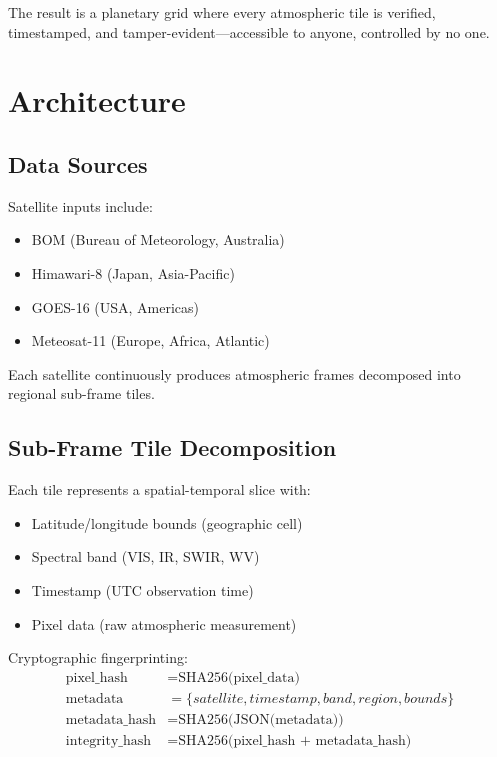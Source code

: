 \documentclass[11pt]{article}
\begin{document}
The result is a planetary grid where every atmospheric tile is verified, timestamped, and tamper-evident---accessible to anyone, controlled by no one.

\section{Architecture}

\subsection{Data Sources}

Satellite inputs include:
\begin{itemize}
    \item BOM (Bureau of Meteorology, Australia)
    \item Himawari-8 (Japan, Asia-Pacific)
    \item GOES-16 (USA, Americas)
    \item Meteosat-11 (Europe, Africa, Atlantic)
\end{itemize}

Each satellite continuously produces atmospheric frames decomposed into regional sub-frame tiles.

\subsection{Sub-Frame Tile Decomposition}

Each tile represents a spatial-temporal slice with:
\begin{itemize}
    \item Latitude/longitude bounds (geographic cell)
    \item Spectral band (VIS, IR, SWIR, WV)
    \item Timestamp (UTC observation time)
    \item Pixel data (raw atmospheric measurement)
\end{itemize}

Cryptographic fingerprinting:
\begin{align}
\text{pixel\_hash} &= \text{SHA256(pixel\_data)} \\
\text{metadata} &= \{satellite, timestamp, band, region, bounds\} \\
\text{metadata\_hash} &= \text{SHA256(JSON(metadata))} \\
\text{integrity\_hash} &= \text{SHA256(pixel\_hash + metadata\_hash)}
\end{align}
\end{document}
